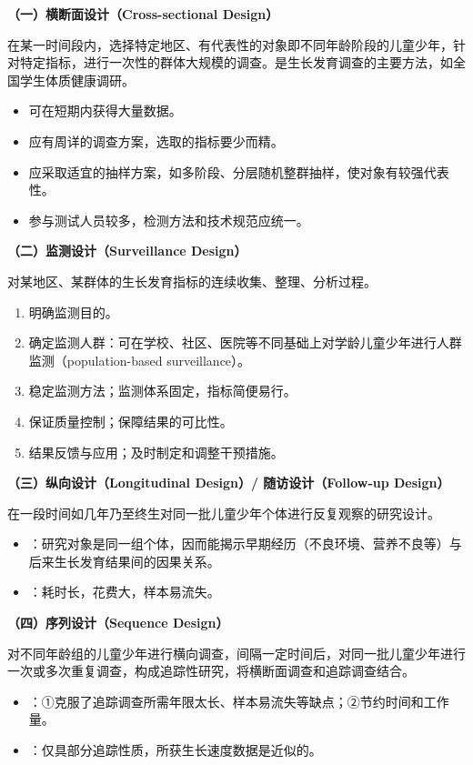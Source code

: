 \begin{keybox}
\textbf{（一）横断面设计（Cross-sectional Design）}

在某一时间段内，选择特定地区、有代表性的对象即不同年龄阶段的儿童少年，针对特定指标，进行一次性的群体大规模的调查。是生长发育调查的主要方法，如全国学生体质健康调研。

\begin{itemize}[leftmargin=*]
    \item 可在短期内获得大量数据。
    \item 应有周详的调查方案，选取的指标要少而精。
    \item 应采取适宜的抽样方案，如多阶段、分层随机整群抽样，使对象有较强代表性。
    \item 参与测试人员较多，检测方法和技术规范应统一。
\end{itemize}

\textbf{（二）监测设计（Surveillance Design）}

对某地区、某群体的生长发育指标的连续收集、整理、分析过程。

\begin{enumerate}[leftmargin=*]
    \item 明确监测目的。
    \item 确定监测人群：可在学校、社区、医院等不同基础上对学龄儿童少年进行人群监测（population-based surveillance）。
    \item 稳定监测方法；监测体系固定，指标简便易行。
    \item 保证质量控制；保障结果的可比性。
    \item 结果反馈与应用；及时制定和调整干预措施。
\end{enumerate}

\textbf{（三）纵向设计（Longitudinal Design）/ 随访设计（Follow-up Design）}

在一段时间如几年乃至终生对同一批儿童少年个体进行反复观察的研究设计。

\begin{itemize}[leftmargin=*]
    \item {}：研究对象是同一组个体，因而能揭示早期经历（不良环境、营养不良等）与后来生长发育结果间的因果关系。
    \item {}：耗时长，花费大，样本易流失。
\end{itemize}

\textbf{（四）序列设计（Sequence Design）}

对不同年龄组的儿童少年进行横向调查，间隔一定时间后，对同一批儿童少年进行一次或多次重复调查，构成追踪性研究，将横断面调查和追踪调查结合。

\begin{itemize}[leftmargin=*]
    \item {}：①克服了追踪调查所需年限太长、样本易流失等缺点；②节约时间和工作量。
    \item {}：仅具部分追踪性质，所获生长速度数据是近似的。
\end{itemize}
\end{keybox}

